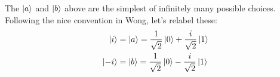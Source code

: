 \documentclass[12pt]{extarticle}
\begin{document}
The $\ket{a}$ and $\ket{b}$ above are the simplest of infinitely many possible choices.
Following the nice convention in Wong\cite{wong2022}, let's relabel these:
\begin{align*}
\ket{i} & = \ket{a} = \frac{1}{\sqrt{2}}\ket{0} + \frac{i}{\sqrt{2}}\ket{1} \\
\ket{-i} & = \ket{b} = \frac{1}{\sqrt{2}}\ket{0} - \frac{i}{\sqrt{2}}\ket{1} \\
\end{align*}

\printbibliography
\end{document}
